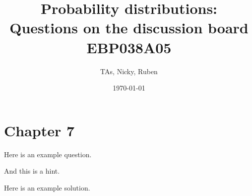 \documentclass[a4paper,11pt]{article}
\title{Probability distributions: Questions on the discussion board\\
EBP038A05
}
\author{TAs, Nicky, Ruben}
\date{\today}
\begin{document}
\maketitle
\tableofcontents

\section{Chapter 7}
\label{sec:chapter-7}

\begin{exercise}
Here is an example question.
\begin{hint}
  And this is a hint.
\end{hint}
\begin{solution}
  Here is an example solution.
\end{solution}
\end{exercise}



\end{document}

